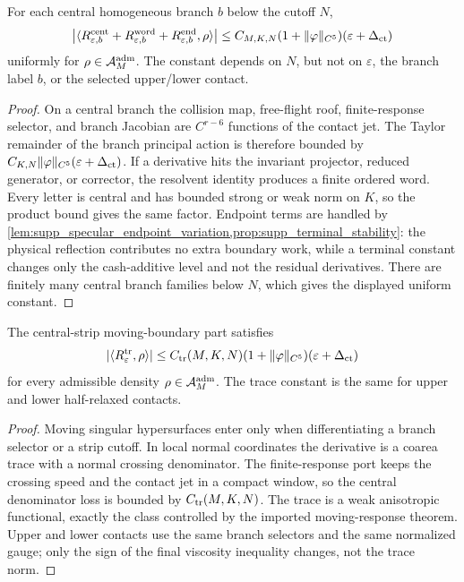 \begin{lemma}
\label{lem:supp_central_branch_residual_check}
For each central homogeneous branch \(b\) below the cutoff \(N\),
\[
  \bigl|\langle
  R_{\varepsilon,b}^{\rm cent}
  +R_{\varepsilon,b}^{\rm word}
  +R_{\varepsilon,b}^{\rm end},\rho\rangle\bigr|
  \le
  C_{M,K,N}
  (1+\|\varphi\|_{C^5})
  (\varepsilon+\Delta_{\rm ct})
\]
uniformly for \(\rho\in\mathcal A^{\mathrm{adm}}_M\).  The constant depends on \(N\), but not on
\(\varepsilon\), the branch label \(b\), or the selected upper/lower contact.
\end{lemma}

\begin{proof}
On a central branch the collision map, free-flight roof, finite-response
selector, and branch Jacobian are \(C^{r-6}\) functions of the contact jet.
The Taylor remainder of the branch principal action is therefore bounded by
\(C_{K,N}\|\varphi\|_{C^5}(\varepsilon+\Delta_{\rm ct})\).  If a derivative
hits the invariant projector, reduced generator, or corrector, the resolvent
identity produces a finite ordered word.  Every letter is central and has
bounded strong or weak norm on \(K\), so the product bound gives the same
factor.  Endpoint terms are handled by
\cref{lem:supp_specular_endpoint_variation,prop:supp_terminal_stability}: the
physical reflection contributes no extra boundary work, while a terminal
constant changes only the cash-additive level and not the residual
derivatives.  There are finitely many central branch families below \(N\),
which gives the displayed uniform constant.
\end{proof}

\begin{lemma}
\label{lem:supp_trace_branch_residual_check}
The central-strip moving-boundary part satisfies
\[
  |\langle R_\varepsilon^{\rm tr},\rho\rangle|
  \le
  C_{\rm tr}(M,K,N)
  (1+\|\varphi\|_{C^5})
  (\varepsilon+\Delta_{\rm ct})
\]
for every admissible density \(\rho\in\mathcal A^{\mathrm{adm}}_M\).  The trace constant is the same
for upper and lower half-relaxed contacts.
\end{lemma}

\begin{proof}
Moving singular hypersurfaces enter only when differentiating a branch
selector or a strip cutoff.  In local normal coordinates the derivative is a
coarea trace with a normal crossing denominator.  The finite-response port
keeps the crossing speed and the contact jet in a compact window, so the
central denominator loss is bounded by \(C_{\rm tr}(M,K,N)\).  The trace is a
weak anisotropic functional, exactly the class controlled by the imported
moving-response theorem.  Upper and lower contacts use the same branch
selectors and the same normalized gauge; only the sign of the final viscosity
inequality changes, not the trace norm.
\end{proof}

